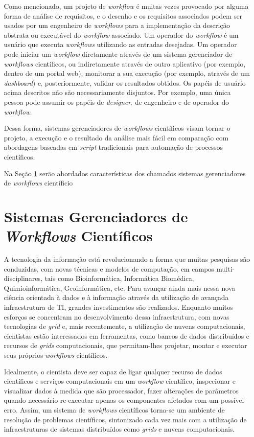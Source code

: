 Como mencionado, um projeto de \textit{workflow} é muitas vezes provocado por alguma forma de análise de requisitos, e o desenho e os requisitos associados podem ser usados por um engenheiro de \textit{workflows} para a implementação da descrição abstrata ou executável do \textit{workflow} associado. Um operador do \textit{workflow} é um usuário que executa \textit{workflows} utilizando as entradas desejadas. Um operador pode iniciar um \textit{workflow} diretamente através de um sistema gerenciador de \textit{workflows} científicos, ou indiretamente através de outro aplicativo (por exemplo, dentro de um portal web), monitorar a sua execução (por exemplo, através de um \textit{dashboard}) e, posteriormente, validar os resultados obtidos. Os papéis de usuário acima descritos não são necessariamente disjuntos. Por exemplo, uma única pessoa pode assumir os papéis de \textit{designer}, de engenheiro e de operador do \textit{workflow}. 

Dessa forma, sistemas gerenciadores de \textit{workflows} científicos visam tornar o projeto, a execução e o resultado da análise mais fácil em comparação com abordagens baseadas em \textit{script} tradicionais para automação de processos científicos.

Na Seção \ref{cap3sec3} serão abordados características dos chamados sistemas gerenciadores de \textit{workflows} científicio

\section{Sistemas Gerenciadores de \textit{Workflows} Científicos} \label{cap3sec3}

A tecnologia da informação está revolucionando a forma que muitas pesquisas são conduzidas, com novas técnicas e modelos de computação, em campos multi-disciplinares, tais como Bioinformática, Informática Biomédica, Quimioinformática, Geoinformática, etc. Para avançar ainda mais nessa nova ciência orientada à dados e à informação através da utilização de avançada infraestrutura de TI, grandes investimentos são realizados. Enquanto muitos esforços se concentram no desenvolvimento dessa infraestrutura, com novas tecnologias de \textit{grid} e, mais recentemente, a utilização de nuvens computacionais, cientistas estão interessados em ferramentas, como bancos de dados distribuídos e recursos de \textit{grids} computacionais, que permitam-lhes projetar, montar e executar seus próprios \textit{workflows} científicos. 

Idealmente, o cientista deve ser capaz de ligar qualquer recurso de dados científicos e serviços computacionais em um \textit{workflow} científico, inspecionar e visualizar dados à medida que são processador, fazer alterações de parâmetros quando necessário re-executar apenas os componentes afetados com um possível erro. Assim, um sistema de \textit{workflows} científicos torna-se um ambiente de resolução de problemas científicos, sintonizado cada vez mais com a utilização de infraestruturas de sistemas distribuídos como \textit{grids} e nuvens computacionais.

